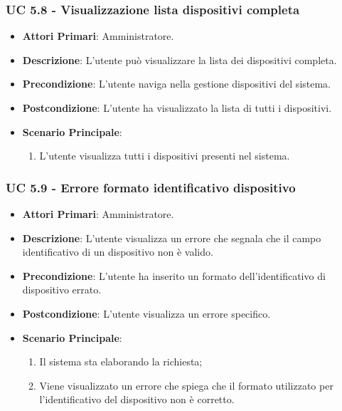 			\subsubsection{UC 5.8 - Visualizzazione lista dispositivi completa}
			\begin{itemize}
				\item \textbf{Attori Primari}: Amministratore.
				\item \textbf{Descrizione}: L'utente può visualizzare la lista dei dispositivi completa.
				\item \textbf{Precondizione}: L'utente naviga nella gestione dispositivi del sistema.
				\item \textbf{Postcondizione}: L'utente ha visualizzato la lista di tutti i dispositivi.
				\item \textbf{Scenario Principale}:
				\begin{enumerate}
					\item{L'utente visualizza tutti i dispositivi presenti nel sistema.}
				\end{enumerate}
			\end{itemize}

			\subsubsection{UC 5.9 - Errore formato identificativo dispositivo}
			\begin{itemize}
				\item \textbf{Attori Primari}: Amministratore.
				\item \textbf{Descrizione}: L'utente visualizza un errore che segnala che il campo identificativo di un dispositivo non è valido.
				\item \textbf{Precondizione}: L'utente ha inserito un formato dell'identificativo di dispositivo errato.
				\item \textbf{Postcondizione}: L'utente visualizza un errore specifico.
				\item \textbf{Scenario Principale}:
				\begin{enumerate}
					\item Il sistema sta elaborando la richiesta;
					\item Viene visualizzato un errore che spiega che il formato utilizzato per l'identificativo del dispositivo non è corretto.
				\end{enumerate}
			\end{itemize}
